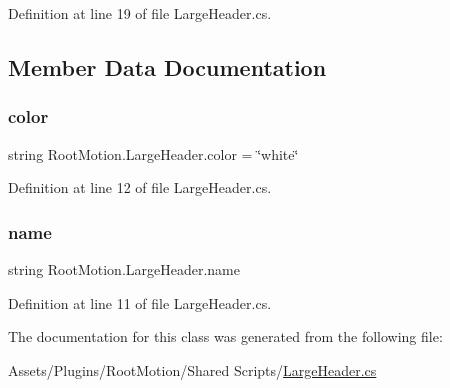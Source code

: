 Definition at line 19 of file Large\+Header.\+cs.



\subsection{Member Data Documentation}
\mbox{\label{class_root_motion_1_1_large_header_a14e8705d8aad81a28ae5cf9995c00967}} 
\subsubsection{\texorpdfstring{color}{color}}
{\footnotesize\ttfamily string Root\+Motion.\+Large\+Header.\+color = \char`\"{}white\char`\"{}}



Definition at line 12 of file Large\+Header.\+cs.

\mbox{\label{class_root_motion_1_1_large_header_a8f861b25f68f4c63341d2f0470addad4}} 
\subsubsection{\texorpdfstring{name}{name}}
{\footnotesize\ttfamily string Root\+Motion.\+Large\+Header.\+name}



Definition at line 11 of file Large\+Header.\+cs.



The documentation for this class was generated from the following file\+:\begin{DoxyCompactItemize}
\item 
Assets/\+Plugins/\+Root\+Motion/\+Shared Scripts/\mbox{\hyperlink{_large_header_8cs}{Large\+Header.\+cs}}\end{DoxyCompactItemize}
